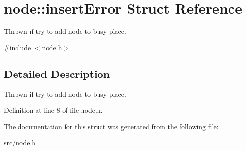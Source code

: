 \hypertarget{structnode_1_1insertError}{\section{node\-:\-:insert\-Error Struct Reference}
\label{structnode_1_1insertError}
}


Thrown if try to add node to busy place.  




{\ttfamily \#include $<$node.\-h$>$}



\subsection{Detailed Description}
Thrown if try to add node to busy place. 

Definition at line 8 of file node.\-h.



The documentation for this struct was generated from the following file\-:\begin{DoxyCompactItemize}
\item 
src/node.\-h\end{DoxyCompactItemize}
